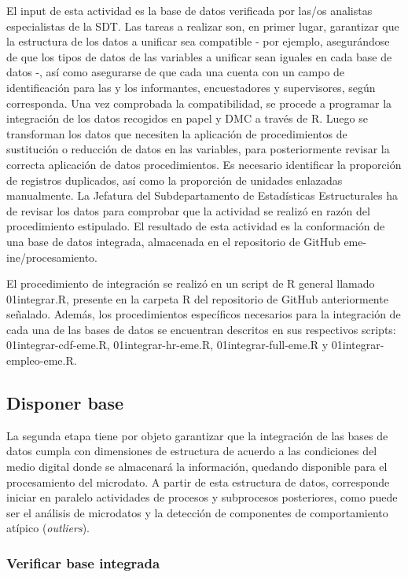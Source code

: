 \documentclass[
]{article}
\begin{document}
El input de esta actividad es la base de datos verificada por las/os analistas especialistas de la SDT. Las tareas a realizar son, en primer lugar, garantizar que la estructura de los datos a unificar sea compatible - por ejemplo, asegurándose de que los tipos de datos de las variables a unificar sean iguales en cada base de datos -, así como asegurarse de que cada una cuenta con un campo de identificación para las y los informantes, encuestadores y supervisores, según corresponda. Una vez comprobada la compatibilidad, se procede a programar la integración de los datos recogidos en papel y DMC a través de R. Luego se transforman los datos que necesiten la aplicación de procedimientos de sustitución o reducción de datos en las variables, para posteriormente revisar la correcta aplicación de datos procedimientos. Es necesario identificar la proporción de registros duplicados, así como la proporción de unidades enlazadas manualmente. La Jefatura del Subdepartamento de Estadísticas Estructurales ha de revisar los datos para comprobar que la actividad se realizó en razón del procedimiento estipulado. El resultado de esta actividad es la conformación de una base de datos integrada, almacenada en el repositorio de GitHub eme-ine/procesamiento.

El procedimiento de integración se realizó en un script de R general llamado 01integrar.R, presente en la carpeta R del repositorio de GitHub anteriormente señalado. Además, los procedimientos específicos necesarios para la integración de cada una de las bases de datos se encuentran descritos en sus respectivos scripts: 01integrar-cdf-eme.R, 01integrar-hr-eme.R, 01integrar-full-eme.R y 01integrar-empleo-eme.R.

\hypertarget{disponer-base}{%
\subsection{Disponer base}\label{disponer-base}}

La segunda etapa tiene por objeto garantizar que la integración de las bases de datos cumpla con dimensiones de estructura de acuerdo a las condiciones del medio digital donde se almacenará la información, quedando disponible para el procesamiento del microdato. A partir de esta estructura de datos, corresponde iniciar en paralelo actividades de procesos y subprocesos posteriores, como puede ser el análisis de microdatos y la detección de componentes de comportamiento atípico (\emph{outliers}).

\hypertarget{verificar-base-integrada}{%
\subsubsection{Verificar base integrada}\label{verificar-base-integrada}}
\end{document}
